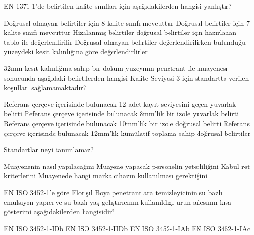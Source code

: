 \begin{question}[subtitle= EN 1371-1]
  EN 1371-1'de belirtilen kalite sınıfları için aşağıdakilerden hangisi yanlıştır?
	\begin{tasks}
		\task Doğrusal olmayan belirtiler için 8 kalite sınıfı mevcuttur
		\task Doğrusal belirtiler için 7 kalite sınıfı mevcuttur
		\task Hizalanmış belirtiler doğrusal belirtiler için hazırlanan tablo ile değerlendirilir 
		\task Doğrusal olmayan belirtiler değerlendirilirken bulunduğu yüzeydeki kesit kalınlığına göre değerlendirlirler \correct
	\end{tasks}
\end{question}
\begin{solution}
	\correct
\end{solution}

\begin{question}[subtitle= EN 1371-1]
  32mm kesit kalınlığına sahip bir döküm yüzeyinin penetrant ile muayenesi sonucunda aşağıdaki belirtilerden hangisi Kalite Seviyesi 3 için standartta verilen koşulları sağlamamaktadır?
	\begin{tasks}
		\task Referans çerçeve içerisinde bulunacak 12 adet kayıt seviyesini geçen yuvarlak belirti
		\task Referans çerçeve içerisinde bulunacak 8mm'lik bir izole yuvarlak belirti
		\task Referans çerçeve içerisinde bulunacak 10mm'lik bir izole doğrusal belirti \correct
		\task Referans çerçeve içerisinde bulunacak 12mm'lik kümülatif toplama sahip doğrusal belirtiler
	\end{tasks}
\end{question}
\begin{solution}
	\correct
\end{solution}

\begin{question}[subtitle=]
Standartlar neyi tanımlamaz?
	\begin{tasks}
          \task Muayenenin nasıl yapılacağını
          \task Muayene yapacak personelin yeterliliğini
          \task Kabul ret kriterlerini
          \task Muayenede hangi marka cihazın kullanılması gerektiğini \correct
	\end{tasks}
\end{question}
\begin{solution}
	\correct
\end{solution}


\begin{question}[subtitle=]
EN ISO 3452-1'e göre Florışıl Boya penetrant ara temizleyicinin su bazlı emülsiyon yapıcı ve su bazlı
yaş geliştiricinin kullanıldığı ürün ailesinin kısa gösterimi aşağıdakilerden hangisidir?
	\begin{tasks}
          \task EN ISO 3452-1-IDb
          \task EN ISO 3452-1-IIDb \correct
          \task EN ISO 3452-1-IAb
          \task EN ISO 3452-1-IAc
	\end{tasks}
\end{question}
\begin{solution}
	\correct
\end{solution}



